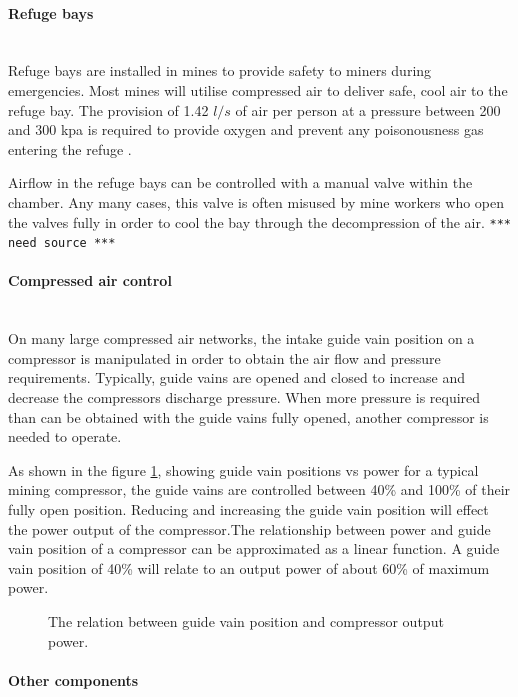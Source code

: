 	\paragraph*{Refuge bays}\leavevmode\\
	Refuge bays are installed in mines to provide safety to miners during emergencies. Most mines will utilise compressed air to deliver safe, cool air to the refuge bay. The provision of 1.42 $l/s$ of air per person at a pressure between 200 and 300 \gls{kpa} is required to provide oxygen and prevent any poisonousness gas entering the refuge \cite{brake1999criteria}.\par
	Airflow in the refuge bays can be controlled with a manual valve within the chamber. Any many cases, this valve is often misused by mine workers who open the valves fully in order to cool the bay through the decompression of the air. \texttt{*** need source ***}
	\paragraph*{Compressed air control}\leavevmode\\
	On many large compressed air networks, the intake guide vain position on a compressor is manipulated in order to obtain the air flow and pressure requirements. Typically, guide vains are opened and closed to increase and decrease the compressors discharge pressure. When more pressure is required than can be obtained with the guide vains fully opened, another compressor is needed to operate.\par
	As shown in the figure \ref{fig: Guide vain position}, showing guide vain positions vs power for a typical mining compressor, the guide vains are controlled between 40\% and 100\% of their fully open position. Reducing and increasing the guide vain position will effect the power output of the compressor.The relationship between power and guide vain position of a compressor can be approximated as a linear function. A guide vain position of 40\% will relate to an output power of about 60\% of maximum power.
	\begin{figure}[h]
		\centering
		\fbox{}
		\caption[The relation between guide vain position and compressor output power.]{The relation between guide vain position and compressor output power.}
		\label{fig: Guide vain position}
	\end{figure}
	\paragraph*{Other components}\leavevmode\\
